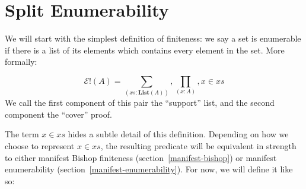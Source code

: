\section{Split Enumerability} \label{split-enumerable}
We will start with the simplest definition of finiteness: we say a set is
enumerable if there is a list of its elements which contains every element in
the set.
More formally:
\begin{rm-definition}
  \begin{equation}
    \mathcal{E}!(A) = \sum_{(\mathit{xs} : \textbf{List}(A))} , \prod_{(x : A)} , x \in xs
  \end{equation}
  We call the first component of this pair the ``support'' list, and the second
  component the ``cover'' proof.
\end{rm-definition}

The term \(x \in \mathit{xs}\) hides a subtle detail of this definition.
Depending on how we choose to represent \(x \in \mathit{xs}\), the resulting
predicate will be equivalent in strength to either manifest Bishop finiteness
(section~\ref{manifest-bishop}) or manifest enumerability
(section~\ref{manifest-enumerability}).
For now, we will define it like so:

